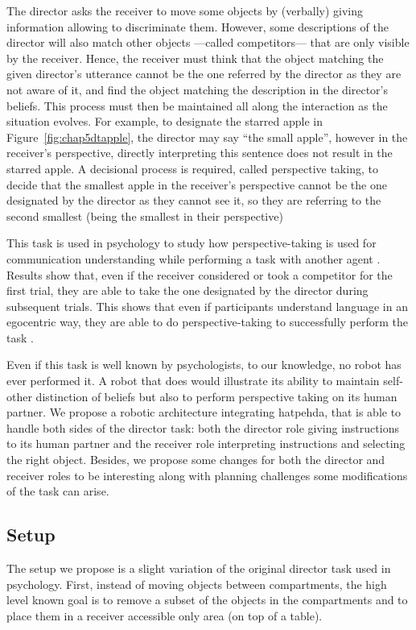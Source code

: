 \documentclass[a4paper,11pt,twoside]{StyleThese}
\begin{document}
The director asks the receiver to move some objects by (verbally) giving information allowing to discriminate them. However, some descriptions of the director will also match other objects ---called competitors--- that are only visible by the receiver. Hence, the receiver must think that the object matching the given director's utterance cannot be the one referred by the director as they are not aware of it, and find the object matching the description in the director's beliefs. This process must then be maintained all along the interaction as the situation evolves. For example, to designate the starred apple in Figure~\ref{fig:chap5dtapple}, the director may say ``the small apple'', however in the receiver's perspective, directly interpreting this sentence does not result in the starred apple. A decisional process is required, called perspective taking, to decide that the smallest apple in the receiver's perspective cannot be the one designated by the director as they cannot see it, so they are referring to the second smallest (being the smallest in their perspective)

\medskip

This task is used in psychology to study how perspective-taking is used for communication understanding while performing a task with another agent \cite{keysar2000taking}. Results show that, even if the receiver considered or took a competitor for the first trial, they are able to take the one designated by the director during subsequent trials. This shows that even if participants understand language in an egocentric way, they are able to do perspective-taking to successfully perform the task \cite{keysar2003limits}. 

Even if this task is well known by psychologists, to our knowledge, no robot has ever performed it. A robot that does would illustrate its ability to maintain self-other distinction of beliefs but also to perform perspective taking on its human partner. We propose a robotic architecture integrating \acrshort{hatpehda}, that is able to handle both sides of the director task: both the director role giving instructions to its human partner and the receiver role interpreting instructions and selecting the right object. Besides, we propose some changes for both the director and receiver roles to be interesting along with planning challenges some modifications of the task can arise.

\subsection{Setup}
The setup we propose is a slight variation of the original director task used in psychology. First, instead of moving objects between compartments, the high level known goal is to remove a subset of the objects in the compartments and to place them in a receiver accessible only area (on top of a table). 
\end{document}
